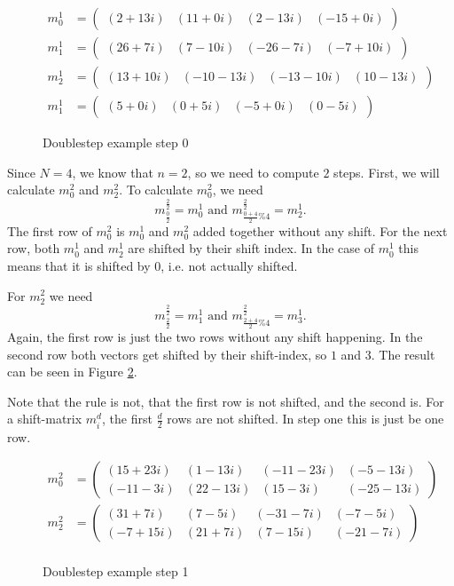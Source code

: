 \documentclass[12pt]{article}
\begin{document}
\begin{figure} [H]
	\begin{align*} 
	m_0^1&=\begin{pmatrix}
	(2+13i) & (11+0i) & (2-13i) & (-15+0i)
\end{pmatrix} \\
m_1^1&=\begin{pmatrix}
	(26+7i) & (7-10i) & (-26-7i) & (-7+10i)
\end{pmatrix} \\
m_2^1&=\begin{pmatrix}
	(13+10i) & (-10-13i) & (-13-10i) & (10-13i)
\end{pmatrix} \\
m_1^1&=\begin{pmatrix}
	(5+0i) & (0+5i) & (-5+0i) & (0-5i)
\end{pmatrix}
	\end{align*}
	\caption{Doublestep example step 0}
	\label{calc::doublestepEx0}
\end{figure}

Since $N=4$, we know that $n=2$, so we need to compute $2$ steps. First, we will calculate $m_0^2$ and $m_2^2$. To calculate $m_0^2$, we need 
\[
m_{\frac{0}{2}}^{\frac{2}{2}}=m_0^1 \textrm{ and } m_{\frac{0+4}{2}\%4}^{\frac{2}{2}}=m_2^1.
\]
The first row of $m_0^2$ is $m_0^1$ and $m_0^2$ added together without any shift. For the next row, both $m_0^1$ and $m_2^1$ are shifted by their shift index. In the case of $m_0^1$ this means that it is shifted by $0$, i.e. not actually shifted.

For $m_2^2$ we need 
\[
m_{\frac{2}{2}}^{\frac{2}{2}}=m_1^1 \textrm{ and } m_{\frac{2+4}{2}\%4}^{\frac{2}{2}}=m_3^1.
\]
Again, the first row is just the two rows without any shift happening. In the second row both vectors get shifted by their shift-index, so $1$ and $3$. The result can be seen in Figure \ref{calc::doublestepEx1}.

Note that the rule is not, that the first row is not shifted, and the second is. For a shift-matrix $m_i^d$, the first $\frac{d}{2}$ rows are not shifted. In step one this is just be one row.

\begin{figure} [H]
	\begin{align*}
	m_0^2&=\begin{pmatrix}
	(15+23i) & (1-13i) & (-11-23i) & (-5-13i) \\
	(-11-3i) & (22-13i) & (15-3i) & (-25-13i)
	\end{pmatrix} \\
	m_2^2&=\begin{pmatrix}
	(31+7i) & (7-5i) & (-31-7i) & (-7-5i) \\
	(-7+15i) & (21+7i) & (7-15i) & (-21-7i)
	\end{pmatrix} \\
	\end{align*}
	\caption{Doublestep example step 1}
	\label{calc::doublestepEx1}
\end{figure}
\end{document}
